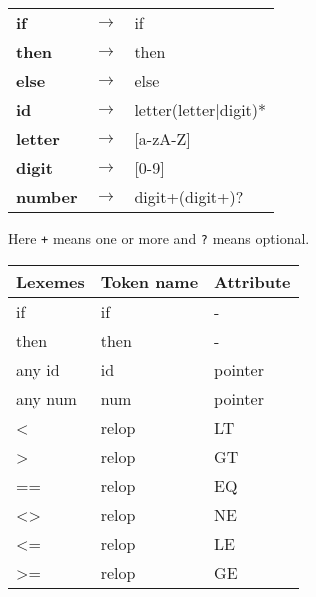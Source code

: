 \begin{example}
    \hfill
    \begin{center}
        \ttfamily
        \begin{tabular}{lll}
            \toprule
            \textbf{if}     & $\to$ & if                         \\
            \textbf{then}   & $\to$ & then                       \\
            \textbf{else}   & $\to$ & else                       \\
            \textbf{id}     & $\to$ & letter(letter$\mid$digit)* \\
            \textbf{letter} & $\to$ & [a-zA-Z]                   \\
            \textbf{digit}  & $\to$ & [0-9]                      \\
            \textbf{number} & $\to$ & digit+(digit+)?            \\
            \bottomrule
        \end{tabular}
    \end{center}
    Here \texttt{+} means one or more and \texttt{?} means optional.
\end{example}

\begin{example}
    \hfill
    \begin{center}
        \ttfamily
        \begin{tabular}{lll}
            \toprule
            \normalfont Lexemes & \normalfont Token name & \normalfont Attribute \\
            \midrule
            if      & if    & -       \\
            then    & then  & -       \\
            any id  & id    & pointer \\
            any num & num   & pointer \\
            <       & relop & LT      \\
            >       & relop & GT      \\
            ==      & relop & EQ      \\
            <>      & relop & NE      \\
            <=      & relop & LE      \\
            >=      & relop & GE      \\
            \bottomrule
        \end{tabular}
    \end{center}
\end{example}

